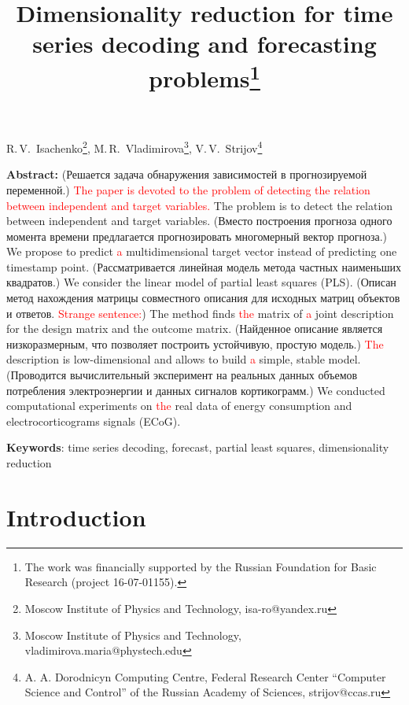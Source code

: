 \documentclass[12pt,twoside]{article}
\begin{document}
	\title
	{Dimensionality reduction for time series decoding and forecasting problems\thanks{The work was financially supported by the Russian Foundation for Basic Research (project 16-07-01155).}}
	\date{}
	\maketitle
	\begin{center}
		R.\,V.~Isachenko\footnote{Moscow Institute of Physics and Technology, isa-ro@yandex.ru},
		M.\,R.~Vladimirova\footnote{Moscow Institute of Physics and Technology, vladimirova.maria@phystech.edu},
		V.\,V.~Strijov\footnote{A. A. Dorodnicyn Computing Centre, Federal Research Center “Computer Science and Control” of the Russian Academy of Sciences, strijov@ccas.ru}
	\end{center}
	\textbf{Abstract:} 
	(Решается задача обнаружения зависимостей в прогнозируемой переменной.) 
	\textcolor{red}{The paper is devoted to the problem of detecting the relation between independent and target variables. }
	The problem is to detect the relation between independent and target variables.
	(Вместо построения прогноза одного момента времени предлагается прогнозировать многомерный вектор прогноза.)
	We propose to predict \textcolor{red}{a} multidimensional target vector instead of predicting one timestamp point.
	(Рассматривается линейная модель метода частных наименьших квадратов.)
	We consider the linear model of partial least squares (PLS).
	(Описан метод нахождения матрицы совместного описания для исходных матриц объектов и ответов.  \textcolor{red}{Strange sentence:})
	The method finds \textcolor{red}{the} matrix of \textcolor{red}{a} joint description for the design matrix and the outcome matrix.
	(Найденное описание является низкоразмерным, что позволяет построить устойчивую, простую модель.)
	\textcolor{red}{The} description is low-dimensional and allows to build \textcolor{red}{a} simple, stable model.
	(Проводится вычислительный эксперимент на реальных данных объемов потребления электроэнергии и данных сигналов кортикограмм.)
	We conducted computational experiments on \textcolor{red}{the} real data of energy consumption and electrocorticograms signals (ECoG).
	
	\bigskip
	\textbf{Keywords}: time series decoding, forecast, partial least squares, dimensionality reduction

\linenumbers
\section{Introduction}
\end{document}
